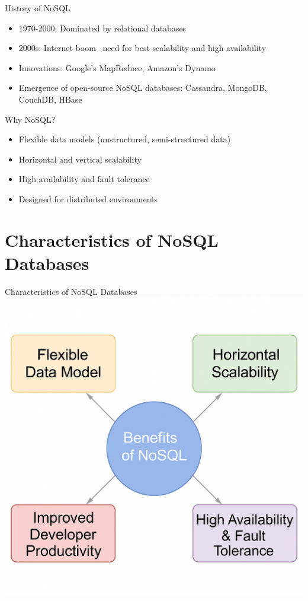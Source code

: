 \documentclass[aspectratio=169]{beamer}
\begin{document}
\begin{frame}{History of NoSQL}
\begin{itemize}
    \item 1970-2000: Dominated by relational databases
    \item 2000s: Internet boom \textrightarrow ~need for best scalability and high availability
    \item Innovations: Google's MapReduce, Amazon's Dynamo
    \item Emergence of open-source NoSQL databases: Cassandra, MongoDB, CouchDB, HBase
\end{itemize}
\end{frame}

\begin{frame}{Why NoSQL?}
\begin{itemize}
    \item Flexible data models (unstructured, semi-structured data)
    \item Horizontal and vertical scalability
    \item High availability and fault tolerance
    \item Designed for distributed environments
\end{itemize}
\end{frame}

\section{Characteristics of NoSQL Databases}

\begin{frame}{\centering Characteristics of NoSQL Databases}
    \centering
    \includegraphics[width=0.55\linewidth]{figures/nosql_benefits_diagram}
\end{frame}
\end{document}
